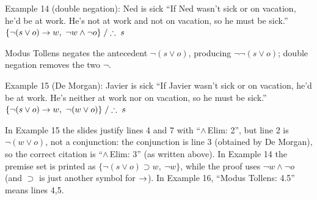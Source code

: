 \begin{nbexample}{Example 14 (double negation): Ned is sick}
``If Ned wasn't sick or on vacation, he'd be at work. He's not at work and not on vacation,
so he must be sick.'' $\{\neg(s \lor o) \rightarrow w,\ \neg w \land \neg o\} \;/\therefore\; s$
\begin{fitchproof}
 \RPrem
{} \RPrem
{} 
 
 
 
 
\end{fitchproof}
Modus Tollens negates the antecedent $\neg(s \lor o)$, producing $\neg\neg(s \lor o)$;
double negation removes the two $\neg$.
\end{nbexample}

\begin{nbexample}{Example 15 (De Morgan): Javier is sick}
``If Javier wasn't sick or on vacation, he'd be at work. He's neither at work nor on
vacation, so he must be sick.'' $\{\neg(s \lor o) \rightarrow w,\ \neg(w \lor o)\} \;/\therefore\; s$
\begin{fitchproof}
 \RPrem
{} \RPrem
{} 
 
 
 
 
 
\end{fitchproof}
\end{nbexample}

\begin{nbwarning}
In Example 15 the slides justify lines 4 and 7 with ``$\land$\,Elim: 2'', but line 2 is
$\neg(w \lor o)$, not a conjunction: the conjunction is line 3 (obtained by De Morgan), so
the correct citation is ``$\land$\,Elim: 3'' (as written above). In Example 14 the premise
set is printed as $\{\neg(s\lor o) \supset w,\ \neg w\}$, while the proof uses
$\neg w \land \neg o$ (and $\supset$ is just another symbol for $\rightarrow$). In Example 16,
``Modus Tollens: 4.5'' means lines 4,5.
\end{nbwarning}

